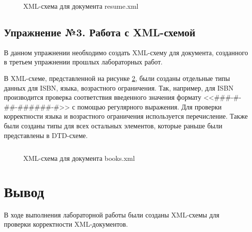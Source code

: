 \documentclass[a4paper, 14pt]{extarticle}
\begin{document}
\inputminted{xml}{../code/task-2/resume_XML.xml}
\begin{figure}[H]
  \caption{XML-схема для документа resume.xml}
  \label{fig:task-2:resume_XML.xml}
\end{figure}

\subsection*{Упражнение №3. Работа с XML-схемой}

В данном упражнении необходимо создать XML-схему для документа, созданного в
третьем упражнении прошлых лабораторных работ.

В XML-схеме, представленной на рисунке \ref{fig:task-3:books_XML.xml}, были
созданы отдельные типы данных для ISBN, языка, возрастного ограничения. Так,
например, для ISBN производится проверка соответствия введенного значения
формату <<\#\#\#-\#-\#\#-\#\#\#\#\#\#-\#>> с помощью регулярного выражения. Для
проверки корректности языка и возрастного ограничения используется перечисление.
Также были созданы типы для всех остальных элементов, которые раньше были
представлены в DTD-схеме.

\inputminted{xml}{../code/task-3/books_XML.xml}
\begin{figure}[H]
  \caption{XML-схема для документа books.xml}
  \label{fig:task-3:books_XML.xml}
\end{figure}

\section{Вывод}

В ходе выполнения лабораторной работы были созданы XML-схемы для проверки
корректности XML-документов.
\end{document}
